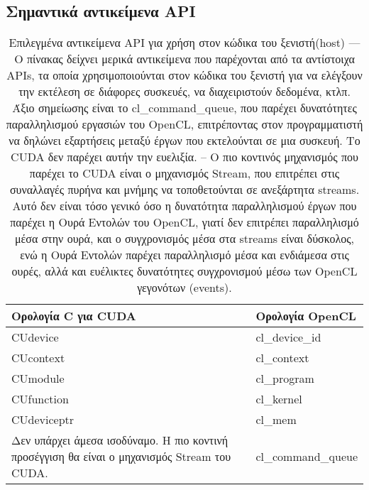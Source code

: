 \subsection{Σημαντικά αντικείμενα API}
\begin{table}[!htbp]
	\begin{tabular}{|p{8cm}|p{8cm}|}
	\hline 
	\rowcolor[HTML]{C0C0C0} 
	Ορολογία C για CUDA & Ορολογία OpenCL \\ \hline
	CUdevice & cl\_device\_id \\ \hline
	CUcontext & cl\_context \\ \hline
	CUmodule & cl\_program \\ \hline
	CUfunction & cl\_kernel \\ \hline
	CUdeviceptr & cl\_mem \\ \hline
	Δεν υπάρχει άμεσα ισοδύναμο. Η πιο κοντινή προσέγγιση θα είναι ο μηχανισμός Stream του CUDA. & cl\_command\_queue \\ \hline
	\end{tabular}
	\caption{Επιλεγμένα αντικείμενα API για χρήση στον κώδικα του ξενιστή(host) — Ο πίνακας δείχνει μερικά αντικείμενα που παρέχονται από τα αντίστοιχα APIs, τα οποία χρησιμοποιούνται στον κώδικα του ξενιστή για να ελέγξουν την εκτέλεση σε διάφορες συσκευές, να διαχειριστούν δεδομένα, κτλπ. Άξιο σημείωσης είναι το cl\_command\_queue, που παρέχει δυνατότητες παραλληλισμού εργασιών του OpenCL, επιτρέποντας στον προγραμματιστή να δηλώνει εξαρτήσεις μεταξύ έργων που εκτελούνται σε μια συσκευή. Το CUDA δεν παρέχει αυτήν την ευελιξία. – Ο πιο κοντινός μηχανισμός που παρέχει το CUDA είναι ο μηχανισμός Stream, που επιτρέπει στις συναλλαγές πυρήνα και μνήμης να τοποθετούνται σε ανεξάρτητα streams. Αυτό δεν είναι τόσο γενικό όσο η δυνατότητα παραλληλισμού έργων που παρέχει η Ουρά Εντολών του OpenCL, γιατί δεν επιτρέπει παραλληλισμό μέσα στην ουρά, και ο συγχρονισμός μέσα στα streams είναι δύσκολος, ενώ η Ουρά Εντολών παρέχει παραλληλισμό μέσα και ενδιάμεσα στις ουρές, αλλά και ευέλικτες δυνατότητες συγχρονισμού μέσω των OpenCL γεγονότων (events).}
\end{table}
\clearpage
